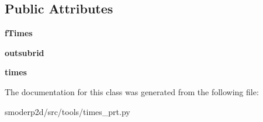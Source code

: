 \subsection*{Public Attributes}
\begin{DoxyCompactItemize}
\item 
\hypertarget{classsmoderp2d_1_1src_1_1tools_1_1times__prt_1_1TimesPrt_a169eae410f43ff85b68f5bf5306e3acb}{{\bfseries f\-Times}}\label{classsmoderp2d_1_1src_1_1tools_1_1times__prt_1_1TimesPrt_a169eae410f43ff85b68f5bf5306e3acb}

\item 
\hypertarget{classsmoderp2d_1_1src_1_1tools_1_1times__prt_1_1TimesPrt_ad38d98b1f1e7bb24eccb06acb8252856}{{\bfseries outsubrid}}\label{classsmoderp2d_1_1src_1_1tools_1_1times__prt_1_1TimesPrt_ad38d98b1f1e7bb24eccb06acb8252856}

\item 
\hypertarget{classsmoderp2d_1_1src_1_1tools_1_1times__prt_1_1TimesPrt_a4f3c75594d01d3d5dbee4244edd4fb64}{{\bfseries times}}\label{classsmoderp2d_1_1src_1_1tools_1_1times__prt_1_1TimesPrt_a4f3c75594d01d3d5dbee4244edd4fb64}

\end{DoxyCompactItemize}


The documentation for this class was generated from the following file\-:\begin{DoxyCompactItemize}
\item 
smoderp2d/src/tools/times\-\_\-prt.\-py\end{DoxyCompactItemize}
